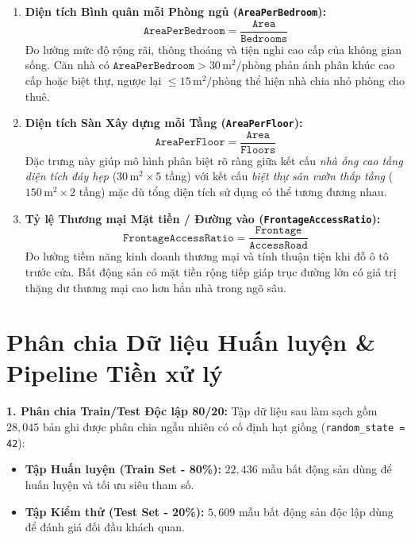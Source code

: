 \documentclass[12pt,a4paper]{report}
\begin{document}
\begin{enumerate}[leftmargin=1.5em]
    \item \textbf{Diện tích Bình quân mỗi Phòng ngủ (\texttt{AreaPerBedroom}):}
    \begin{equation}
    \texttt{AreaPerBedroom} = \frac{\texttt{Area}}{\texttt{Bedrooms}}
    \end{equation}
    Đo lường mức độ rộng rãi, thông thoáng và tiện nghi cao cấp của không gian sống. Căn nhà có $\texttt{AreaPerBedroom} > 30\,\text{m}^2/\text{phòng}$ phản ánh phân khúc cao cấp hoặc biệt thự, ngược lại $\le 15\,\text{m}^2/\text{phòng}$ thể hiện nhà chia nhỏ phòng cho thuê.
    \item \textbf{Diện tích Sàn Xây dựng mỗi Tầng (\texttt{AreaPerFloor}):}
    \begin{equation}
    \texttt{AreaPerFloor} = \frac{\texttt{Area}}{\texttt{Floors}}
    \end{equation}
    Đặc trưng này giúp mô hình phân biệt rõ ràng giữa kết cấu \textit{nhà ống cao tầng diện tích đáy hẹp} ($30\,\text{m}^2 \times 5$ tầng) với kết cấu \textit{biệt thự sân vườn thấp tầng} ($150\,\text{m}^2 \times 2$ tầng) mặc dù tổng diện tích sử dụng có thể tương đương nhau.
    \item \textbf{Tỷ lệ Thương mại Mặt tiền / Đường vào (\texttt{FrontageAccessRatio}):}
    \begin{equation}
    \texttt{FrontageAccessRatio} = \frac{\texttt{Frontage}}{\texttt{AccessRoad}}
    \end{equation}
    Đo lường tiềm năng kinh doanh thương mại và tính thuận tiện khi đỗ ô tô trước cửa. Bất động sản có mặt tiền rộng tiếp giáp trục đường lớn có giá trị thặng dư thương mại cao hơn hẳn nhà trong ngõ sâu.
\end{enumerate}

\section{Phân chia Dữ liệu Huấn luyện \& Pipeline Tiền xử lý}

\textbf{1. Phân chia Train/Test Độc lập 80/20:}
Tập dữ liệu sau làm sạch gồm $28,045$ bản ghi được phân chia ngẫu nhiên có cố định hạt giống (\texttt{random\_state = 42}):
\begin{itemize}[leftmargin=1.5em]
    \item \textbf{Tập Huấn luyện (Train Set - 80\%):} $22,436$ mẫu bất động sản dùng để huấn luyện và tối ưu siêu tham số.
    \item \textbf{Tập Kiểm thử (Test Set - 20\%):} $5,609$ mẫu bất động sản độc lập dùng để đánh giá đối đầu khách quan.
\end{itemize}
\end{document}
